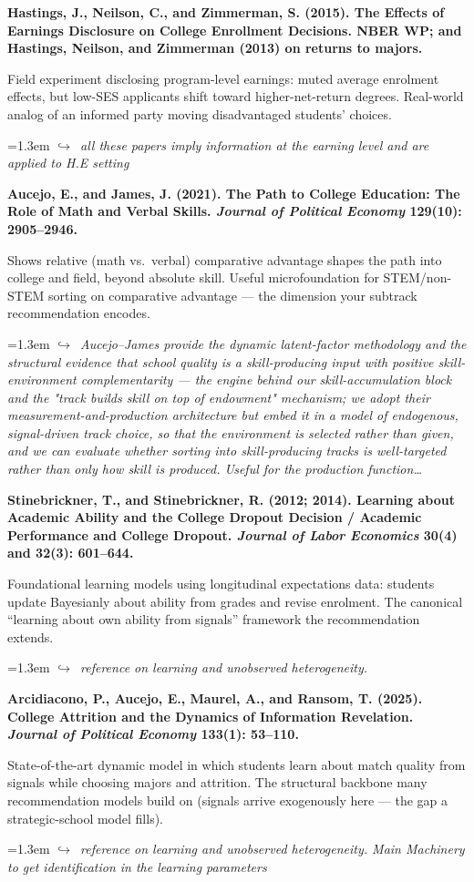 \documentclass[11pt]{article}
\newcommand{\entry}[3]{%
  \par\medskip\noindent\textbf{#1}\par
  \nopagebreak #2\hspace{0.35em}{\small\color{tagcol}[#3]}\par}
\newcommand{\note}[1]{\par\smallskip\noindent\hangindent=1.3em
  \textcolor{notecol}{\footnotesize$\hookrightarrow$~\textit{#1}}}
\begin{document}
\entry{Hastings, J., Neilson, C., and Zimmerman, S. (2015). The Effects of Earnings
Disclosure on College Enrollment Decisions. NBER WP; and Hastings, Neilson, and Zimmerman
(2013) on returns to majors.}
{Field experiment disclosing program-level earnings: muted average enrolment effects, but
low-SES applicants shift toward higher-net-return degrees. Real-world analog of an
informed party moving disadvantaged students' choices.}{EXP / RF}
\note{all these papers imply information at the earning level and are applied to H.E setting}


\entry{Aucejo, E., and James, J. (2021). The Path to College Education: The Role of Math
and Verbal Skills. \textit{Journal of Political Economy} 129(10): 2905--2946.}
{Shows relative (math vs.\ verbal) comparative advantage shapes the path into college and
field, beyond absolute skill. Useful microfoundation for STEM/non-STEM sorting on
comparative advantage --- the dimension your subtrack recommendation encodes.}{STR / RF}
\note{Aucejo–James provide the dynamic latent-factor methodology and the structural evidence that school quality is a skill-producing input with positive skill-environment complementarity — the engine behind our skill-accumulation block and the "track builds skill on top of endowment" mechanism; we adopt their measurement-and-production architecture but embed it in a model of endogenous, signal-driven track choice, so that the environment is selected rather than given, and we can evaluate whether sorting into skill-producing tracks is well-targeted rather than only how skill is produced. Useful for the production function\dots}


\entry{Stinebrickner, T., and Stinebrickner, R. (2012; 2014). Learning about Academic
Ability and the College Dropout Decision / Academic Performance and College Dropout.
\textit{Journal of Labor Economics} 30(4) and 32(3): 601--644.}
{Foundational learning models using longitudinal expectations data: students update
Bayesianly about ability from grades and revise enrolment. The canonical ``learning about
own ability from signals'' framework the recommendation extends.}{STR}
\note{reference on learning and unobserved heterogeneity.}

\entry{Arcidiacono, P., Aucejo, E., Maurel, A., and Ransom, T. (2025). College Attrition
and the Dynamics of Information Revelation. \textit{Journal of Political Economy} 133(1):
53--110.}
{State-of-the-art dynamic model in which students learn about match quality from signals
while choosing majors and attrition. The structural backbone many recommendation models
build on (signals arrive exogenously here --- the gap a strategic-school model fills).}{STR}
\note{reference on learning and unobserved heterogeneity. Main Machinery to get identification in the learning parameters}
\end{document}
